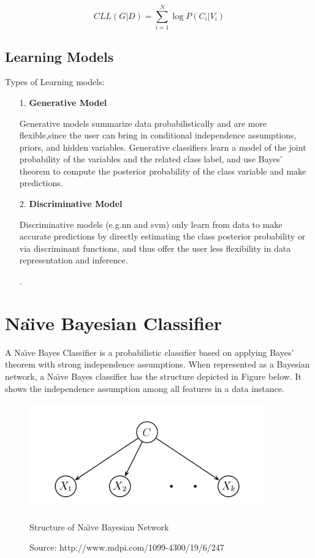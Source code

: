\[CLL (G|D)=\sum_{i=1}^{N}\log P(C_i|V_i) \]
\newpage
\par
\subsection{Learning Models}
\par 
Types of Learning models:
\begin{enumerate}
\item[1.] \textbf{Generative Model}
\par
Generative models summarize data probabilistically and are more flexible,since the user can bring in conditional independence assumptions, priors, and hidden variables. Generative classifiers learn a model of the joint probability of the variables and the related class label, and use Bayes’ theorem to compute the posterior probability of the class variable and make predictions. 

\item[2.] \textbf{Discriminative Model}
\par
Discriminative models (e.g.\acs{nn} and \acs{svm}) only learn from data to make accurate predictions by directly estimating the class posterior probability or via discriminant functions, and thus offer the user less flexibility in data representation and inference.
\item[.] 
\end{enumerate}
\section{Na\"{\i}ve Bayesian Classifier}

\par
A Na\"{\i}ve Bayes Classifier is a probabilistic classifier based on applying Bayes’ theorem with strong independence  assumptions. When represented as a Bayesian network, a Na\"{\i}ve Bayes classifier has the structure depicted in Figure below.  \cite{friedman1997bayesian} It shows the independence assumption among all features in a data instance.
\begin{figure}[bh] %
\begin{small}

	\includegraphics[width=4in]{images/naivebayesian.jpg}
	\caption{Structure of Na\"{\i}ve Bayesian Network} %
	\caption*{Source:   http://www.mdpi.com/1099-4300/19/6/247}
	\label{NB} %
\end{small}
\end{figure}

